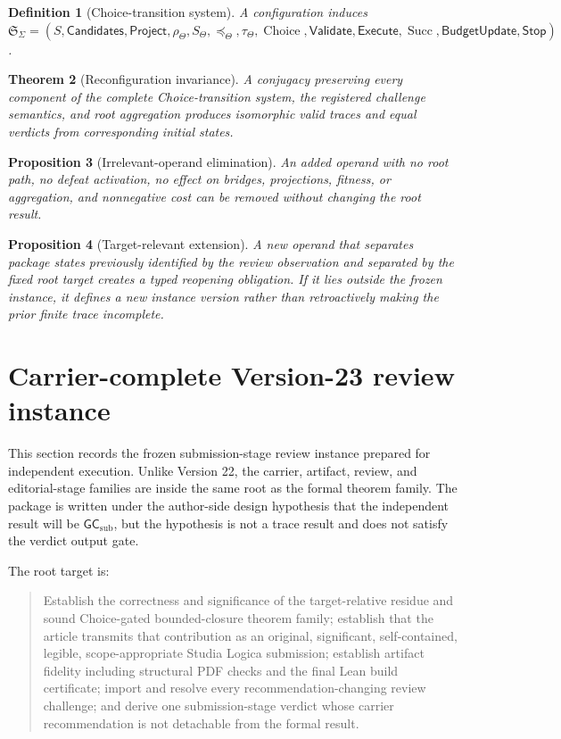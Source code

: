 \documentclass[10pt]{article}
\newtheorem{definition}{Definition}[section]
\newtheorem{theorem}[definition]{Theorem}
\newtheorem{proposition}[definition]{Proposition}
\newcommand{\Choice}{\operatorname{Choice}}
\newcommand{\Succ}{\operatorname{Succ}}
\newcommand{\Config}{\Sigma}
\newcommand{\Candidates}{\mathsf{Candidates}}
\newcommand{\Project}{\mathsf{Project}}
\newcommand{\Validate}{\mathsf{Validate}}
\newcommand{\Execute}{\mathsf{Execute}}
\newcommand{\BudgetUpdate}{\mathsf{BudgetUpdate}}
\newcommand{\Target}{\Theta}
\newcommand{\GCsub}{\mathsf{GC}_{\mathrm{sub}}}
\begin{document}
\begin{definition}[Choice-transition system]
A configuration induces $\mathfrak S_\Config=(S,\Candidates,\Project,\rho_\Target,S_\Target,
\preceq_\Target,\tau_\Target,\Choice,\Validate,\Execute,\Succ,\BudgetUpdate,\mathsf{Stop})$.
\end{definition}

\begin{theorem}[Reconfiguration invariance]\label{thm:reconfig}
A conjugacy preserving every component of the complete Choice-transition system, the registered challenge semantics, and root aggregation produces isomorphic valid traces and equal verdicts from corresponding initial states.
\end{theorem}

\begin{proposition}[Irrelevant-operand elimination]\label{prop:irrelevant}
An added operand with no root path, no defeat activation, no effect on bridges, projections, fitness, or aggregation, and nonnegative cost can be removed without changing the root result.
\end{proposition}

\begin{proposition}[Target-relevant extension]\label{prop:extension}
A new operand that separates package states previously identified by the review observation and separated by the fixed root target creates a typed reopening obligation.  If it lies outside the frozen instance, it defines a new instance version rather than retroactively making the prior finite trace incomplete.
\end{proposition}



\section{Carrier-complete Version-23 review instance}

This section records the frozen submission-stage review instance prepared for independent execution.  Unlike Version 22, the carrier, artifact, review, and editorial-stage families are inside the same root as the formal theorem family.  The package is written under the author-side design hypothesis that the independent result will be $\GCsub$, but the hypothesis is not a trace result and does not satisfy the verdict output gate.

The root target is:
\begin{quote}
Establish the correctness and significance of the target-relative residue and sound Choice-gated bounded-closure theorem family; establish that the article transmits that contribution as an original, significant, self-contained, legible, scope-appropriate Studia Logica submission; establish artifact fidelity including structural PDF checks and the final Lean build certificate; import and resolve every recommendation-changing review challenge; and derive one submission-stage verdict whose carrier recommendation is not detachable from the formal result.
\end{quote}
\end{document}
